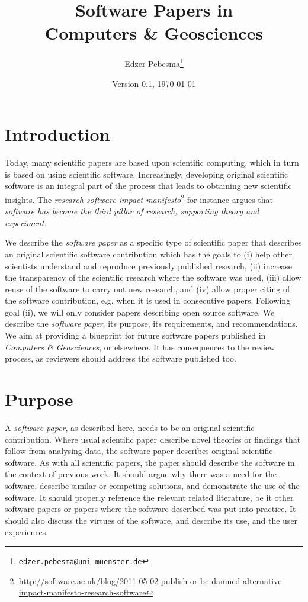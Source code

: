 \documentclass{article}
\author{Edzer Pebesma\footnote{{\tt edzer.pebesma@uni-muenster.de}}}
\date{Version 0.1, \today}
\title{\bf Software Papers in \\ Computers \& Geosciences}
\begin{document}
\maketitle

\section{Introduction}
Today, many scientific papers are based upon scientific
computing, which in turn is based on using scientific
software. Increasingly, developing original scientific
software is an integral part of the process that leads to
obtaining new scientific insights. The {\em research software impact
manifesto}\footnote{\url{http://software.ac.uk/blog/2011-05-02-publish-or-be-damned-alternative-impact-manifesto-research-software}}
for instance argues that {\em software has become the third pillar
of research, supporting theory and experiment.}

We describe the {\em software paper} as a specific type of scientific
paper that describes an original scientific software contribution
which has the goals to (i) help other scientists understand
and reproduce previously published research, (ii) increase the
transparency of the scientific research where the software was used,
(iii) allow reuse of the software to carry out new research, and
(iv) allow proper citing of the software contribution, e.g. when
it is used in consecutive papers. Following goal (ii), we will
only consider papers describing open source software.  We describe
the {\em software paper}, its purpose, its requirements, and
recommendations. We aim at providing a blueprint for future software
papers published in {\em Computers \& Geosciences}, or elsewhere. It
has consequences to the review process, as reviewers should address
the software published too.

\section{Purpose}

A {\em software paper}, as described here, needs to be an original
scientific contribution. Where usual scientific paper describe
novel theories or findings that follow from analysing data, the
software paper describes original scientific software. As with all
scientific papers, the paper should describe the software in the
context of previous work. It should argue why there was a need
for the software, describe similar or competing solutions, and
demonstrate the use of the software. It should properly reference
the relevant related literature, be it other software papers or
papers where the software described was put into practice. It should
also discuss the virtues of the software, and describe its use,
and the user experiences.
\end{document}
